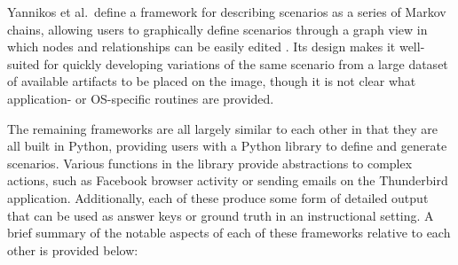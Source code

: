 Yannikos et al.~define a framework for describing scenarios as a series
of Markov chains, allowing users to graphically define scenarios through
a graph view in which nodes and relationships can be easily edited
\cite{yannikosDataCorporaDigital2014}. Its design makes it
well-suited for quickly developing variations of the same scenario from
a large dataset of available artifacts to be placed on the image, though
it is not clear what application- or OS-specific routines are provided.

The remaining frameworks are all largely similar to each other in that
they are all built in Python, providing users with a Python library to
define and generate scenarios. Various functions in the library provide
abstractions to complex actions, such as Facebook browser activity or
sending emails on the Thunderbird application. Additionally, each of
these produce some form of detailed output that can be used as answer
keys or ground truth in an instructional setting. A brief summary of the
notable aspects of each of these frameworks relative to each other is
provided below:

